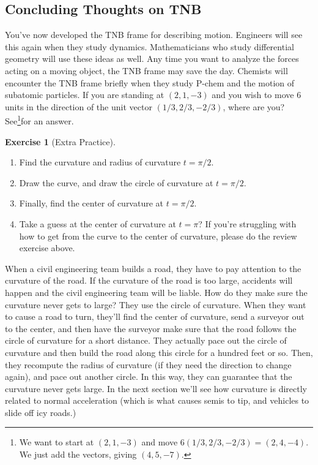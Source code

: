 \documentclass[10pt,]{book}
\theoremstyle{plain}
\theoremstyle{definition}
\theoremstyle{definition}
\theoremstyle{definition}
\theoremstyle{definition}
\newtheorem{exploration}[project]{Exercise}
\theoremstyle{definition}
\numberwithin{equation}{section}
\begin{document}
\subsection[{Concluding Thoughts on TNB}]{Concluding Thoughts on TNB}\label{subsection-27}
You've now developed the TNB frame for describing motion. Engineers will see this again when they study dynamics. Mathematicians who study differential geometry will use these ideas as well. Any time you want to analyze the forces acting on a moving object, the TNB frame may save the day. Chemists will encounter the TNB frame briefly when they study P-chem and the motion of subatomic particles.%
If you are standing at \((2,1,-3)\) and you wish to move 6 units in the direction of the unit vector \((1/3, 2/3, -2/3)\), where are you? See\footnote{We want to start at \((2,1,-3)\) and move \(6(1/3, 2/3, -2/3) = (2,4,-4)\). We just add the vectors, giving \((4,5,-7)\).\label{fn-14}}for an answer.%
\begin{exploration}[Extra Practice]\label{exploration-179}
\leavevmode%
\begin{enumerate}[font=\bfseries,label=(\alph*),ref=\alph*]
\item\label{task-442} Find the curvature and radius of curvature \(t=\pi/2\).%
\item\label{task-443} Draw the curve, and draw the circle of curvature at \(t=\pi/2\).%
\item\label{task-444} Finally, find the center of curvature at \(t=\pi/2\).%
\item\label{task-445} Take a guess at the center of curvature at \(t=\pi\)? If you're struggling with how to get from the curve to the center of curvature, please do the review exercise above.%
%
\end{enumerate}
\end{exploration}
When a civil engineering team builds a road, they have to pay attention to the curvature of the road. If the curvature of the road is too large, accidents will happen and the civil engineering team will be liable. How do they make sure the curvature never gets to large? They use the circle of curvature. When they want to cause a road to turn, they'll find the center of curvature, send a surveyor out to the center, and then have the surveyor make sure that the road follows the circle of curvature for a short distance. They actually pace out the circle of curvature and then build the road along this circle for a hundred feet or so. Then, they recompute the radius of curvature (if they need the direction to change again), and pace out another circle. In this way, they can guarantee that the curvature never gets large. In the next section we'll see how curvature is directly related to normal acceleration (which is what causes semis to tip, and vehicles to slide off icy roads.)%
\typeout{************************************************}
\typeout{************************************************}
\end{document}
